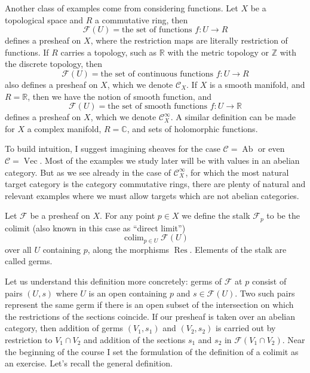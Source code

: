 Another class of examples come from considering functions. Let $X$ be a topological space
and $R$ a commutative ring, then
\[
\mathcal F(U)=\text{the set of functions }f:U\to R
\]
defines a presheaf on $X$, where the restriction maps are literally restriction of functions. If
$R$ carries a topology, such as $\mathbb R$ with the metric topology or $\mathbb Z$ with the discrete topology,
then
\[
\mathcal F(U)=\text{the set of continuous functions }f:U\to R
\]
also defines a presheaf on $X$, which we denote $\mathcal C_X$. If $X$ is a smooth manifold, and $R=\mathbb R$,
then we have the notion of smooth function, and
\[
\mathcal F(U)=\text{the set of smooth functions }f:U\to\mathbb R
\]
defines a presheaf on $X$, which we denote $\mathcal C^\infty_X$. A similar definition can be made for $X$ a
complex manifold, $R=\mathbb C$, and sets of holomorphic functions.

To build intuition, I suggest imagining sheaves for the case $\mathcal C=\operatorname{Ab}$ or even $\mathcal C=\operatorname{Vec}$.
Most of the examples we study later will be with values in an abelian category. But as we
see already in the case of $\mathcal C^\infty_X$, for which the most natural target category is the category
commutative rings, there are plenty of natural and relevant examples where we must allow
targets which are not abelian categories.

\begin{definition}
\label{definition-stalk}
Let $\mathcal F$ be a presheaf on $X$. For any point $p\in X$ we define the stalk $\mathcal F_p$
to be the colimit (also known in this case as “direct limit”)
\[
\operatorname{colim}_{p\in U}\mathcal F(U)
\]
over all $U$ containing $p$, along the morphisms $\operatorname{Res}$. Elements of the stalk are called germs.
\end{definition}

Let us understand this definition more concretely: germs of $\mathcal F$ at $p$ consist of pairs $(U,s)$
where $U$ is an open containing $p$ and $s\in\mathcal F(U)$. Two such pairs represent the same germ if
there is an open subset of the intersection on which the restrictions of the sections coincide.
If our presheaf is taken over an abelian category, then addition of germs $(V_1,s_1)$ and $(V_2,s_2)$
is carried out by restriction to $V_1\cap V_2$ and addition of the sections $s_1$ and $s_2$ in
$\mathcal F(V_1\cap V_2)$.
Near the beginning of the course I set the formulation of the definition of a colimit as an
exercise. Let's recall the general definition.

